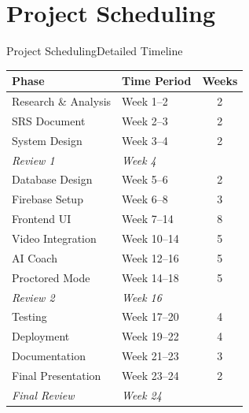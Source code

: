 \documentclass{beamer}
\begin{document}
\section{Project Scheduling}
\begin{frame}{Project Scheduling}{Detailed Timeline}
\begin{table}
\centering
\scriptsize
\begin{tabular}{|p{4cm}|p{3.5cm}|c|}
\hline
\textbf{Phase} & \textbf{Time Period} & \textbf{Weeks} \\ \hline
Research \& Analysis & Week 1--2 & 2 \\ \hline
SRS Document & Week 2--3 & 2 \\ \hline
System Design & Week 3--4 & 2 \\ \hline
\textit{Review 1} & \textit{Week 4} & \\ \hline
Database Design & Week 5--6 & 2 \\ \hline
Firebase Setup & Week 6--8 & 3 \\ \hline
Frontend UI & Week 7--14 & 8 \\ \hline
Video Integration & Week 10--14 & 5 \\ \hline
AI Coach & Week 12--16 & 5 \\ \hline
Proctored Mode & Week 14--18 & 5 \\ \hline
\textit{Review 2} & \textit{Week 16} & \\ \hline
Testing & Week 17--20 & 4 \\ \hline
Deployment & Week 19--22 & 4 \\ \hline
Documentation & Week 21--23 & 3 \\ \hline
Final Presentation & Week 23--24 & 2 \\ \hline
\textit{Final Review} & \textit{Week 24} & \\ \hline
\end{tabular}
\end{table}
\end{frame}

\end{document}
